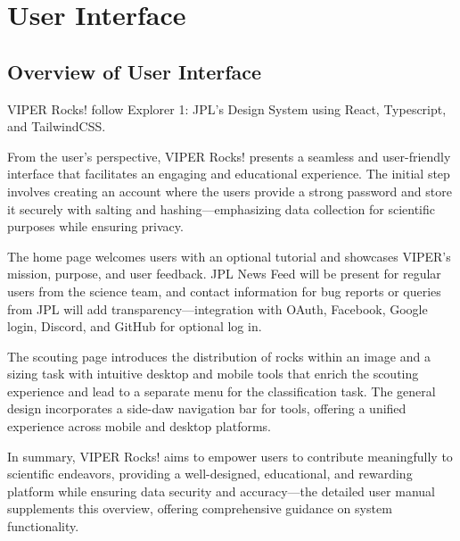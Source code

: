 \documentclass{article}
\begin{document}
\section{User Interface}

\subsection{Overview of User Interface}
VIPER Rocks! follow Explorer 1: JPL’s Design System using React, Typescript, and
TailwindCSS.

From the user’s perspective, VIPER Rocks! presents a seamless and user-friendly interface that facilitates an engaging and educational experience. The initial step involves creating an account where the users provide a strong password and store it securely with salting and hashing—emphasizing data collection for scientific purposes while ensuring privacy.

The home page welcomes users with an optional tutorial and showcases VIPER’s mission, purpose, and user feedback. JPL News Feed will be present for regular users from the science team, and contact information for bug reports or queries from JPL will add transparency—integration with OAuth, Facebook, Google login, Discord, and GitHub for optional log in.

The scouting page introduces the distribution of rocks within an image and a sizing task with intuitive desktop and mobile tools that enrich the scouting experience and lead to a separate menu for the classification task. The general design incorporates a side-daw navigation bar for tools, offering a unified experience across mobile and desktop platforms.

In summary, VIPER Rocks! aims to empower users to contribute meaningfully to scientific endeavors, providing a well-designed, educational, and rewarding platform while ensuring data security and accuracy—the detailed user manual supplements this overview, offering comprehensive guidance on system functionality.
\end{document}
